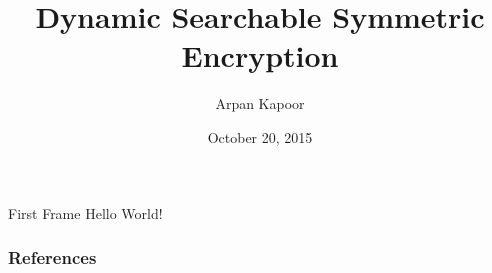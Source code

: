 \documentclass{beamer}
\title{Dynamic Searchable Symmetric Encryption}
\author{Arpan Kapoor}
\institute{National Institute of Technology, Calicut}
\date{October 20, 2015}
\begin{document}
\maketitle

\begin{frame}{First Frame}
	Hello World!
\end{frame}

\begin{frame}[allowframebreaks]
	\frametitle{References}
	\nocite{*}
	
	
\end{frame}
\end{document}
